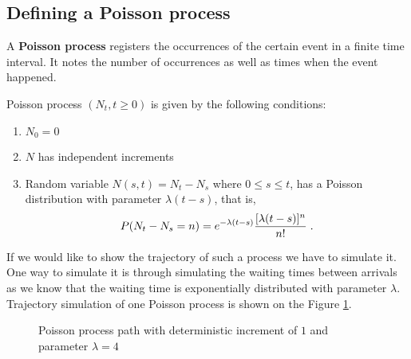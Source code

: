 \documentclass[times, utf8, diplomski]{fer}
\begin{document}
		\subsection{Defining a Poisson process}
		A \textbf{Poisson process} registers the occurrences of the certain event in a finite time interval. It notes the number of occurrences as well as times when the event happened. 
		\begin{definition}
			Poisson process $(N_t, t \geq 0)$ is given by the following conditions:
			\begin{enumerate}
				\item $N_0 = 0$
				\item $N$ has independent increments
				\item Random variable $N(s,t) = N_t - N_s$ where $0 \leq s \leq t$, has a Poisson distribution with parameter $\lambda (t-s)$, that is, 
				\begin{equation} P(N_t - N_s = n) = e^{-\lambda(t-s)}\frac{[\lambda(t-s)]^n}{n!} \hspace{0.1cm}.\end{equation}
			\end{enumerate}
		\end{definition}
\noindent If we would like to show the trajectory of such a process we have to simulate it. One way to simulate it is through simulating the waiting times between arrivals as we know that the waiting time is exponentially distributed with parameter $\lambda$. Trajectory simulation of one Poisson process is shown on the Figure \ref{fig:poisson_process}.
		\begin{figure}[ht]
		\centering
		\caption{Poisson process path with deterministic increment of $1$ and parameter $\lambda = 4$}
	 	\label{fig:poisson_process}
		\end{figure}
\end{document}
